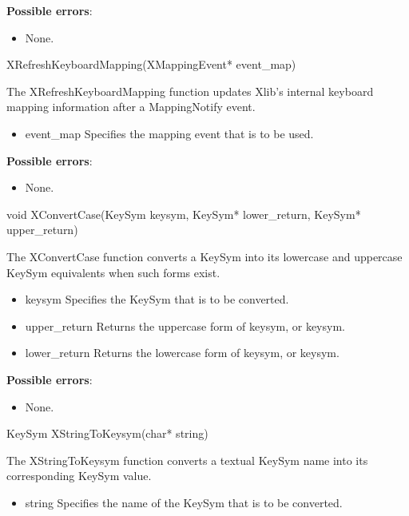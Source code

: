 \documentclass{report}
\begin{document}
\begin{itemize}
        \textbf{Possible errors}:
        \begin{itemize}
            \item None.
        \end{itemize}

        \begin{cppcode}
        XRefreshKeyboardMapping(XMappingEvent* event_map)
        \end{cppcode}
        \bigbreak \noindent
        The XRefreshKeyboardMapping function updates Xlib's internal keyboard mapping information after a MappingNotify event.
        \begin{itemize}
            \item event\_map Specifies the mapping event that is to be used.
        \end{itemize}

        \textbf{Possible errors}:
        \begin{itemize}
            \item None.
        \end{itemize}

        \begin{cppcode}
        void XConvertCase(KeySym keysym, KeySym* lower_return, KeySym* upper_return)
        \end{cppcode}
        \bigbreak \noindent
        The XConvertCase function converts a KeySym into its lowercase and uppercase KeySym equivalents when such forms exist.
        \begin{itemize}
            \item keysym Specifies the KeySym that is to be converted.
            \item upper\_return Returns the uppercase form of keysym, or keysym.
            \item lower\_return Returns the lowercase form of keysym, or keysym.
        \end{itemize}

        \textbf{Possible errors}:
        \begin{itemize}
            \item None.
        \end{itemize}

        \begin{cppcode}
        KeySym XStringToKeysym(char* string)
        \end{cppcode}
        \bigbreak \noindent
        The XStringToKeysym function converts a textual KeySym name into its corresponding KeySym value.
        \begin{itemize}
            \item string Specifies the name of the KeySym that is to be converted.
        \end{itemize}


\end{itemize}
\end{document}
